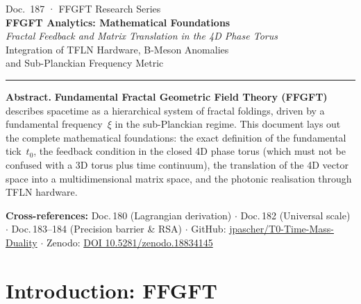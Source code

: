 
\thispagestyle{firstpage}
\begin{center}
  {\small\color{T0gray} Doc.~187 · FFGFT Research Series}\\[6pt]
  {\LARGE\bfseries\color{T0blue}
    FFGFT Analytics: Mathematical Foundations}\\[6pt]
  {\large\itshape\color{T0gray}
    Fractal Feedback and Matrix Translation in the 4D Phase Torus}\\[4pt]
  {\normalsize\color{T0gray}
    Integration of TFLN Hardware, B-Meson Anomalies\\
    and Sub-Planckian Frequency Metric}\\[8pt]
  {\color{T0red}\rule{0.65\linewidth}{1.5pt}}
\end{center}
\vspace{4pt}

\begin{infobox}
\textbf{Abstract.}
\textbf{Fundamental Fractal Geometric Field Theory (FFGFT)} describes
spacetime as a hierarchical system of fractal foldings, driven by a
fundamental frequency~$\xi$ in the sub-Planckian regime.
This document lays out the complete mathematical foundations:
the exact definition of the fundamental tick~$t_0$, the feedback condition
in the closed 4D phase torus (which must not be confused with a 3D torus
plus time continuum), the translation of the 4D vector space into a
multidimensional matrix space, and the photonic realisation through
TFLN hardware.

\smallskip\noindent\textbf{Cross-references:}
Doc.\,180 (Lagrangian derivation) $\cdot$
Doc.\,182 (Universal scale) $\cdot$
Doc.\,183--184 (Precision barrier \& RSA) $\cdot$
GitHub: \href{https://github.com/jpascher/T0-Time-Mass-Duality}{jpascher/T0-Time-Mass-Duality} $\cdot$
Zenodo: \href{https://zenodo.org/records/18834145}{DOI 10.5281/zenodo.18834145}
\end{infobox}

\tableofcontents
\bigskip

\section{Introduction: FFGFT}


